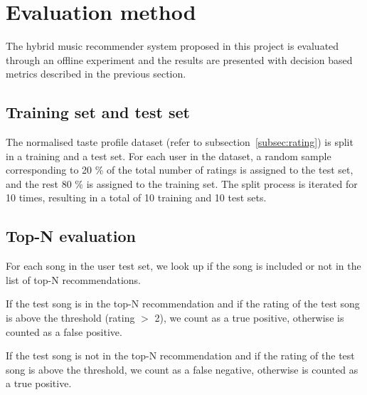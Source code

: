 



\section{Evaluation method}
The hybrid music recommender system proposed in this project is evaluated through an offline experiment and the results are presented with decision based metrics described in the previous section.

\subsection{Training set and test set}
The normalised taste profile dataset (refer to subsection~\ref{subsec:rating}) is split in a training and a test set. For each user in the dataset, a random sample corresponding to 20 \% of the total number of ratings is assigned to the test set, and the rest 80 \% is assigned to the training set. The split process is iterated for 10 times, resulting in a total of 10 training and 10 test sets.

\subsection{Top-N evaluation}
For each song in the user test set, we look up if the song is included or not in the list of top-N recommendations.

If the test song is in the top-N recommendation and if the rating of the test song is above the threshold (rating $>$ 2), we count as a true positive, otherwise is counted as a false positive.

If the test song is not in the top-N recommendation and if the rating of the test song is above the threshold, we count as a false negative, otherwise is counted as a true positive.

